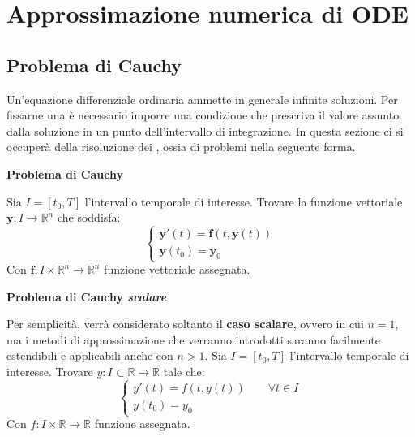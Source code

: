 \section{Approssimazione numerica di ODE}

\subsection{Problema di Cauchy}

Un'equazione differenziale ordinaria ammette in generale infinite soluzioni. Per fissarne una è necessario imporre una condizione che prescriva il valore assunto dalla soluzione in un punto dell'intervallo di integrazione. In questa sezione ci si occuperà della risoluzione dei , ossia di problemi nella seguente forma.

\highspace
\begin{flushleft}
	\textcolor{Red2}{ \textbf{Problema di Cauchy}}
\end{flushleft}
Sia $I = \left[t_{0}, T\right]$ l'intervallo temporale di interesse. Trovare la funzione vettoriale $\mathbf{y}: I \rightarrow \mathbb{R}^{n}$ che soddisfa:
\begin{equation}
	\begin{cases}
		\mathbf{y}'\left(t\right) = \mathbf{f}\left(t, \mathbf{y}\left(t\right)\right) \\
		\mathbf{y}\left(t_{0}\right) = \mathbf{y}_{0}
	\end{cases}
\end{equation}
Con $\mathbf{f}: I \times \mathbb{R}^{n} \rightarrow \mathbb{R}^{n}$ funzione vettoriale assegnata.

\highspace
\begin{flushleft}
	\textcolor{Red2}{ \textbf{Problema di Cauchy \emph{scalare}}}
\end{flushleft}
Per semplicità, verrà considerato soltanto il \textbf{caso scalare}, ovvero in cui $n=1$, ma i metodi di approssimazione che verranno introdotti saranno facilmente estendibili e applicabili anche con $n>1$. Sia $I = \left[t_{0}, T\right]$ l'intervallo temporale di interesse. Trovare $y: I \subset \mathbb{R} \rightarrow \mathbb{R}$ tale che:
\begin{equation}
	\begin{cases}
		y'\left(t\right) = f\left(t, y\left(t\right)\right) \hspace{2em} \forall t \in I \\
		y\left(t_{0}\right) = y_{0}
	\end{cases}
\end{equation}
Con $f: I \times \mathbb{R} \rightarrow \mathbb{R}$ funzione assegnata.

